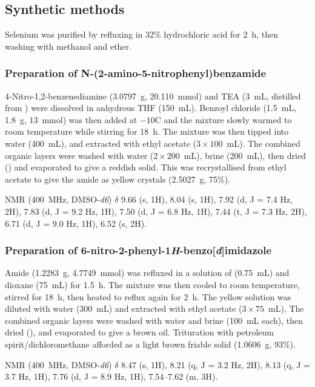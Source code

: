\begin{refsection}
\subsection{Synthetic methods}

Selenium was purified by refluxing in 32\% hydrochloric acid for 2~h, then washing with methanol and ether.

\subsubsection{Preparation of N-(2-amino-5-nitrophenyl)benzamide }
4-Nitro-1,2-benzenediamine (3.0797~g, 20.110~mmol) and TEA (3~mL, distilled from ) were dissolved in anhydrous THF (150~mL).
Benzoyl chloride (1.5~mL, 1.8~g, 13~mmol) was then added at $-10$\degree C and the mixture slowly warmed to room temperature while stirring for 18~h.
The mixture was then tipped into water (400~mL), and extracted with ethyl acetate ($3\times100$~mL).
The combined organic layers were washed with water ($2\times200$~mL), brine (200~mL), then dried () and evaporated to give a reddish solid.
This was recrystallised from ethyl acetate to give the amide  as yellow crystals (2.5027~g, 75\%).

 NMR (400~MHz, DMSO-\emph{d6}) $\delta$ 9.66 (s, 1H), 8.04 (s, 1H), 7.92 (d, J = 7.4 Hz, 2H), 7.83 (d, J = 9.2 Hz, 1H), 7.50 (d, J = 6.8 Hz, 1H), 7.44 (t, J = 7.3 Hz, 2H), 6.71 (d, J = 9.0 Hz, 1H), 6.52 (s, 2H).

\subsubsection{Preparation of 6-nitro-2-phenyl-1\emph{H}-benzo[\emph{d}]imidazole }
Amide  (1.2283~g, 4.7749~mmol) was refluxed in a solution of  (0.75~mL) and dioxane (75~mL) for 1.5~h.
The mixture was then cooled to room temperature, stirred for 18~h, then heated to reflux again for 2~h.
The yellow solution was diluted with water (300~mL) and extracted with ethyl acetate ($3\times75$~mL),
The combined organic layers were washed with water and brine (100~mL each), then dried (), and evaporated to give a brown oil.
Trituration with petroleum spirit/dichloromethane afforded  as a light brown friable solid (1.0606~g, 93\%).

 NMR (400~MHz, DMSO-\emph{d6}) $\delta$ 8.47 (s, 1H), 8.21 (q, J = 3.2 Hz, 2H), 8.13 (q, J = 3.7 Hz, 1H), 7.76 (d, J = 8.9 Hz, 1H), 7.54--7.62 (m, 3H).


\end{refsection}
